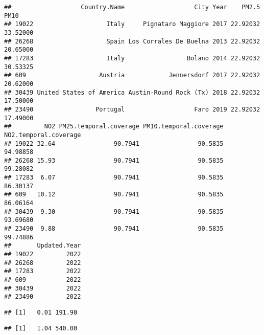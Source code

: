 \documentclass[
]{article}
\newenvironment{Shaded}{\begin{snugshade}}{\end{snugshade}}
\newcommand{\AttributeTok}[1]{\textcolor[rgb]{0.77,0.63,0.00}{#1}}
\newcommand{\ConstantTok}[1]{\textcolor[rgb]{0.00,0.00,0.00}{#1}}
\newcommand{\FloatTok}[1]{\textcolor[rgb]{0.00,0.00,0.81}{#1}}
\newcommand{\FunctionTok}[1]{\textcolor[rgb]{0.00,0.00,0.00}{#1}}
\newcommand{\NormalTok}[1]{#1}
\newcommand{\SpecialCharTok}[1]{\textcolor[rgb]{0.00,0.00,0.00}{#1}}
\begin{document}
\begin{verbatim}
##                   Country.Name                   City Year    PM2.5     PM10
## 19022                    Italy     Pignataro Maggiore 2017 22.92032 33.52000
## 26268                    Spain Los Corrales De Buelna 2013 22.92032 20.65000
## 17283                    Italy                 Bolano 2014 22.92032 30.53325
## 609                    Austria            Jennersdorf 2017 22.92032 20.62000
## 30439 United States of America Austin-Round Rock (Tx) 2018 22.92032 17.50000
## 23490                 Portugal                   Faro 2019 22.92032 17.49000
##         NO2 PM25.temporal.coverage PM10.temporal.coverage NO2.temporal.coverage
## 19022 32.64                90.7941                90.5835              94.98858
## 26268 15.93                90.7941                90.5835              99.28082
## 17283  6.07                90.7941                90.5835              86.30137
## 609   10.12                90.7941                90.5835              86.06164
## 30439  9.30                90.7941                90.5835              93.69680
## 23490  9.88                90.7941                90.5835              99.74886
##       Updated.Year
## 19022         2022
## 26268         2022
## 17283         2022
## 609           2022
## 30439         2022
## 23490         2022
\end{verbatim}

\begin{Shaded}
\end{Shaded}

\begin{verbatim}
## [1]   0.01 191.90
\end{verbatim}

\begin{Shaded}
\end{Shaded}

\begin{verbatim}
## [1]   1.04 540.00
\end{verbatim}
\end{document}
